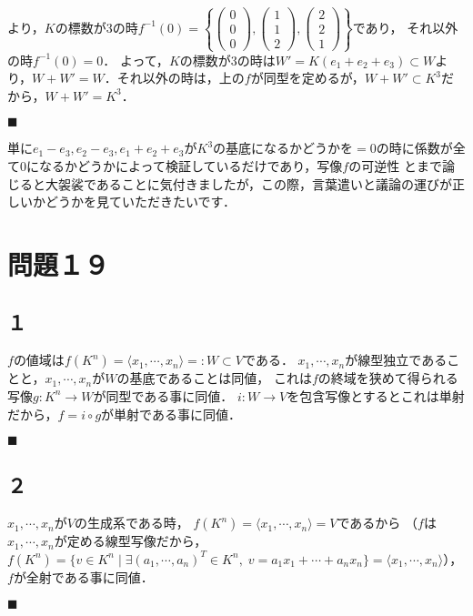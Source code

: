 \documentclass[uplatex, dvipdfmx]{jsarticle}
\begin{document}
より，$K$の標数が3の時$f^{-1}(0)=\left\{\begin{pmatrix}0\\0\\0\end{pmatrix},\begin{pmatrix}1\\1\\2\end{pmatrix},\begin{pmatrix}2\\2\\1\end{pmatrix}\right\}$であり，
それ以外の時$f^{-1}(0)=0$．
よって，$K$の標数が3の時は$W'=K(e_1+e_2+e_3)\subset W$より，$W+W'=W$．それ以外の時は，上の$f$が同型を定めるが，$W+W'\subset K^3$だから，$W+W'=K^3$．
\begin{flushright}$\blacksquare$\end{flushright}

\begin{remark*}
    単に$e_1-e_3,e_2-e_3,e_1+e_2+e_3$が$K^3$の基底になるかどうかを$=0$の時に係数が全て$0$になるかどうかによって検証しているだけであり，写像$f$の可逆性
    とまで論じると大袈裟であることに気付きましたが，この際，言葉遣いと議論の運びが正しいかどうかを見ていただきたいです．
\end{remark*}

\section*{問題１９}
\subsection*{１}

$f$の値域は$f(K^n)=\langle x_1,\cdots,x_n\rangle=:W\subset V$である．
$x_1,\cdots,x_n$が線型独立であることと，$x_1,\cdots,x_n$が$W$の基底であることは同値，
これは$f$の終域を狭めて得られる写像$g:K^n\to W$が同型である事に同値．
$i:W\to V$を包含写像とするとこれは単射だから，$f=i\circ g$が単射である事に同値．
\begin{flushright}$\blacksquare$\end{flushright}

\subsection*{２}

$x_1,\cdots,x_n$が$V$の生成系である時，
$f(K^n)=\langle x_1,\cdots,x_n\rangle =V$であるから
（$f$は$x_1,\cdots,x_n$が定める線型写像だから，$f(K^n)=\{v\in K^n\mid \exists (a_1,\cdots,a_n)^T\in K^n,\; v=a_1x_1+\cdots+a_nx_n\}=\langle x_1,\cdots,x_n\rangle$），
$f$が全射である事に同値．
\begin{flushright}$\blacksquare$\end{flushright}
\end{document}
